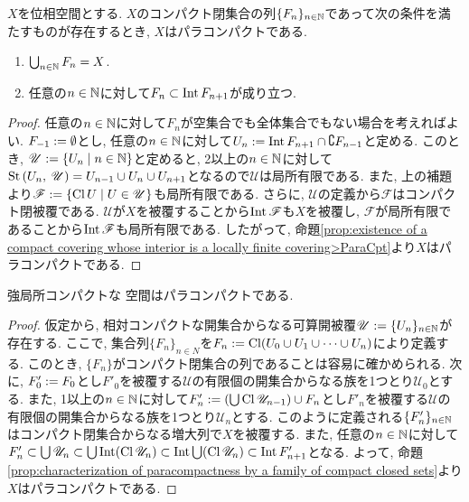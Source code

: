 \documentclass[uplatex, dvipdfmx, a4paper, 12pt, class=jsbook, crop=false]{standalone}
\begin{document}
\begin{proposition}
	\label{prop:characterization of paracompactness by a family of compact closed sets}
	$ X $を位相空間とする. $ X $のコンパクト閉集合の列$ \{F_n\}_{n \in \mathbb{N}} $であって次の条件を満たすものが存在するとき, $ X $はパラコンパクトである.
	\begin{enumerate}
		\item $ \bigcup_{n \in \mathbb{N}} F_n = X $.
		\item 任意の$ n \in \mathbb{N} $に対して$ F_n \subset \mathop{\mathrm{Int}}\nolimits F_{n+1} $が成り立つ.
	\end{enumerate}
\end{proposition}

\begin{proof}
	任意の$ n \in \mathbb{N} $に対して$ F_n $が空集合でも全体集合でもない場合を考えればよい. $ F_{-1} \mathrel{:=} \emptyset $とし, 任意の$ n \in \mathbb{N} $に対して$ U_n \mathrel{:=} \mathop{\mathrm{Int}}\nolimits F_{n+1} \cap \complement F_{n-1} $と定める. このとき, $ \mathscr{U} \defeq \setcomp{U_n}{n \in \N} $と定めると, 2以上の$ n \in \mathbb{N} $に対して$ \mathrm{St}\left(U_n , \: \mathscr{U}\right) = U_{n-1} \cup U_n \cup U_{n+1} $となるので$ \mathscr{U} $は局所有限である. また, 上の補題より$ \mathscr{F} \defeq \setcomp{\topcl U}{U \in \mathscr{U}} $も局所有限である. さらに, $ \mathscr{U} $の定義から$ \mathscr{F} $はコンパクト閉被覆である. $ \mathscr{U} $が$ X $を被覆することから$ \mathop{\mathrm{Int}}\nolimits \mathscr{F} $も$ X $を被覆し, $ \mathscr{F} $が局所有限であることから$ \mathop{\mathrm{Int}}\nolimits \mathscr{F} $も局所有限である. したがって, 命題\ref{prop:existence of a compact covering whose interior is a locally finite covering>ParaCpt}より$ X $はパラコンパクトである.
\end{proof}

\begin{proposition}
	強局所コンパクトな \Lindelof 空間はパラコンパクトである.
\end{proposition}

\begin{proof}
	仮定から, 相対コンパクトな開集合からなる可算開被覆$ \mathscr{U} \mathrel{:=} \{U_n\}_{n \in \mathbb{N}} $が存在する. ここで, 集合列$ \{F_n\}_{n \in N} $を$ F_n \mathrel{:=} \mathop{\mathrm{Cl}}\nolimits (U_0 \cup U_1 \cup \cdots \cup U_n) $により定義する. このとき, $ \{F_n\} $がコンパクト閉集合の列であることは容易に確かめられる. 次に, $ F'_0 \mathrel{:=} F_0 $とし$ F'_0 $を被覆する$ \mathscr{U} $の有限個の開集合からなる族を1つとり$ \mathscr{U}_0 $とする. また, 1以上の$ n \in \mathbb{N} $に対して$ F'_n \mathrel{:=} \left(\bigcup \mathop{\mathrm{Cl}}\nolimits \mathscr{U}_{n-1} \right) \cup F_n $とし$ F'_n $を被覆する$ \mathscr{U} $の有限個の開集合からなる族を1つとり$ \mathscr{U}_n $とする. このように定義される$ \{F'_n\}_{n \in \mathbb{N}} $はコンパクト閉集合からなる増大列で$ X $を被覆する. また, 任意の$ n \in \mathbb{N} $に対して$ F'_n \subset \bigcup \mathscr{U}_n  \subset \bigcup \mathop{\mathrm{Int}}\nolimits (\mathop{\mathrm{Cl}}\nolimits \mathscr{U}_n) \subset \mathop{\mathrm{Int}}\nolimits \bigcup (\mathop{\mathrm{Cl}}\nolimits \mathscr{U}_n) \subset \mathop{\mathrm{Int}}\nolimits F'_{n+1} $となる. よって, 命題\ref{prop:characterization of paracompactness by a family of compact closed sets}より$ X $はパラコンパクトである.
\end{proof}
\end{document}
